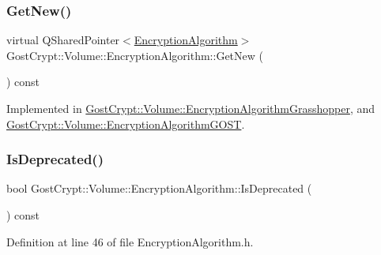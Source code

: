 \subsubsection{\texorpdfstring{Get\+New()}{GetNew()}}
{\footnotesize\ttfamily virtual Q\+Shared\+Pointer$<$\hyperlink{class_gost_crypt_1_1_volume_1_1_encryption_algorithm}{Encryption\+Algorithm}$>$ Gost\+Crypt\+::\+Volume\+::\+Encryption\+Algorithm\+::\+Get\+New (\begin{DoxyParamCaption}{ }\end{DoxyParamCaption}) const\hspace{0.3cm}{\ttfamily [pure virtual]}}



Implemented in \hyperlink{class_gost_crypt_1_1_volume_1_1_encryption_algorithm_grasshopper_a86dd6ab97c46ad5e2d6291f6df2d2cac}{Gost\+Crypt\+::\+Volume\+::\+Encryption\+Algorithm\+Grasshopper}, and \hyperlink{class_gost_crypt_1_1_volume_1_1_encryption_algorithm_g_o_s_t_a32ea0c511bbc1e8445ff09c300d2f40b}{Gost\+Crypt\+::\+Volume\+::\+Encryption\+Algorithm\+G\+O\+ST}.

\mbox{\label{class_gost_crypt_1_1_volume_1_1_encryption_algorithm_a115757d1b9e3a2aa9b26c4b7c25c56e8}} 
\subsubsection{\texorpdfstring{Is\+Deprecated()}{IsDeprecated()}}
{\footnotesize\ttfamily bool Gost\+Crypt\+::\+Volume\+::\+Encryption\+Algorithm\+::\+Is\+Deprecated (\begin{DoxyParamCaption}{ }\end{DoxyParamCaption}) const\hspace{0.3cm}{\ttfamily [inline]}}



Definition at line 46 of file Encryption\+Algorithm.\+h.

\mbox{\label{class_gost_crypt_1_1_volume_1_1_encryption_algorithm_ae0fabca2d13ee8bdfad1e27d8babd803}} 
